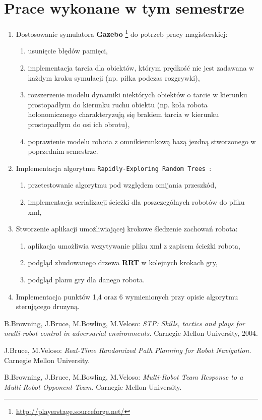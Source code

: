 \documentclass[11pt,onecolumn,a4paper,final]{article}
\begin{document}
\section*{Prace wykonane w tym semestrze}
\begin{enumerate}
 \item Dostosowanie symulatora \textbf{Gazebo} \footnote{\url{http://playerstage.sourceforge.net/}} do potrzeb pracy magisterskiej:
    \begin{enumerate}
    \item usunięcie błędów pamięci,
    \item implementacja tarcia dla obiektów, którym prędkość nie jest zadawana w każdym kroku symulacji (np. piłka podczas rozgrywki),
    \item rozszerzenie modelu dynamiki niektórych obiektów o tarcie w kierunku prostopadłym do kierunku ruchu obiektu (np. koła robota holonomicznego
    charakteryzują się brakiem tarcia w kierunku prostopadłym do osi ich obrotu),
    \item poprawienie modelu robota z omnikierunkową bazą jezdną  stworzonego w poprzednim semestrze.
    \end{enumerate}

    \item Implementacja algorytmu \texttt{Rapidly-Exploring Random Trees \cite{errt}}:
    \begin{enumerate}
     \item przetestowanie algorytmu pod względem omijania przeszkód,
     \item implementacja serializacji ścieżki dla poszczególnych robotów do pliku xml,
    \end{enumerate}
  
    \item Stworzenie aplikacji umożliwiającej krokowe śledzenie zachowań robota:
    \begin{enumerate}
    \item aplikacja umożliwia wczytywanie pliku xml z zapisem ścieżki robota,
    \item podgląd zbudowanego drzewa \textbf{RRT} w kolejnych krokach gry,
    \item podgląd planu gry dla danego robota.
    \end{enumerate}

    \item Implementacja punktów 1,4 oraz 6 wymienionych przy opisie algorytmu sterującego druzyną.
\end{enumerate}

\begin{thebibliography}{9}
	B.Browning, J.Bruce, M.Bowling, M.Veloso:
	\emph{STP: Skills, tactics and plays for multi-robot control
             in adversarial environments.}
	  Carnegie Mellon University, 2004.

	J.Bruce, M.Veloso: 
	\emph{Real-Time Randomized Path Planning for Robot Navigation.}
	  Carnegie Mellon University.

	B.Browning, J.Bruce, M.Bowling, M.Veloso:
	\emph{Multi-Robot Team Response to a Multi-Robot
             Opponent Team.}
	  Carnegie Mellon University.
\end{thebibliography}
\end{document}
